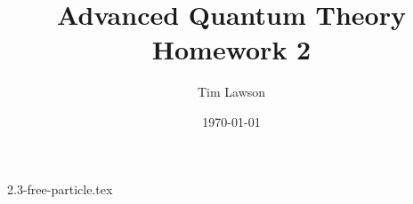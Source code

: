 \documentclass[a4paper]{extarticle}
\title{Advanced Quantum Theory\\
\large Homework 2}
\author{Tim Lawson}
\date{\today}
\begin{document}
\maketitle

\setcounter{section}{2}
\setcounter{subsection}{2}
{2.3-free-particle.tex}
\end{document}
